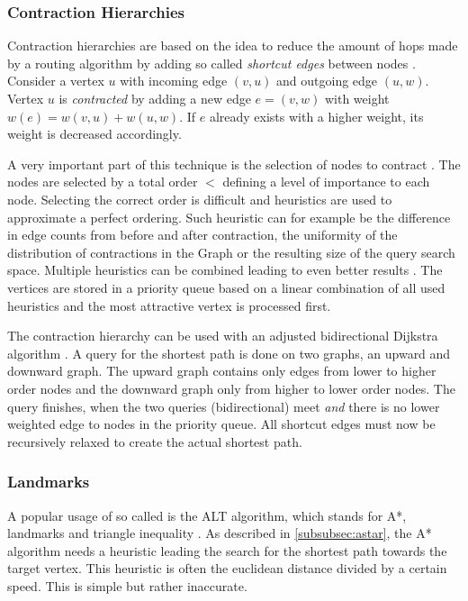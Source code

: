 		\subsubsection{Contraction Hierarchies}
		
			Contraction hierarchies are based on the idea to reduce the amount of hops made by a routing algorithm by adding so called \emph{shortcut edges} between nodes \cite{geisberger-contraction-hierarchies}.
			Consider a vertex $u$ with incoming edge $(v, u)$ and outgoing edge $(u, w)$.
			Vertex $u$ is \emph{contracted} by adding a new edge $e = (v, w)$ with weight $w(e) = w(v, u) + w(u, w)$.
			If $e$ already exists with a higher weight, its weight is decreased accordingly.
			
			A very important part of this technique is the selection of nodes to contract \cite[14]{geisberger-contraction-hierarchies}.
			The nodes are selected by a total order $<$ defining a level of importance to each node.
			Selecting the correct order is difficult and heuristics are used to approximate a perfect ordering.
			Such heuristic can for example be the difference in edge counts from before and after contraction, the uniformity of the distribution of contractions in the Graph or the resulting size of the query search space.
			Multiple heuristics can be combined leading to even better results \cite[49]{geisberger-contraction-hierarchies}.
			The vertices are stored in a priority queue based on a linear combination of all used heuristics and the most attractive vertex is processed first.
			
			The contraction hierarchy can be used with an adjusted bidirectional Dijkstra algorithm \cite[29-30]{geisberger-contraction-hierarchies}.
			A query for the shortest path is done on two graphs, an upward and downward graph.
			The upward graph contains only edges from lower to higher order nodes and the downward graph only from higher to lower order nodes.
			The query finishes, when the two queries (bidirectional) meet \emph{and} there is no lower weighted edge to nodes in the priority queue.
			All shortcut edges must now be recursively relaxed to create the actual shortest path.
		
		\subsubsection{Landmarks}
		
			A popular usage of so called  is the ALT algorithm, which stands for A*, landmarks and triangle inequality \cite{goldberg-landmarks}.
			As described in \cref{subsubsec:astar}, the A* algorithm needs a heuristic leading the search for the shortest path towards the target vertex.
			This heuristic is often the euclidean distance divided by a certain speed.
			This is simple but rather inaccurate.
			
